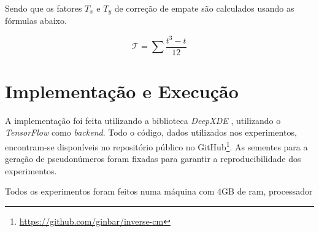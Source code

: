 Sendo que os fatores $T_x$ e $T_y$ de correção de empate são calculados
usando as fórmulas abaixo.  

\begin{equation}
\mathcal{T} = \sum \frac{t^3 - t}{12}
\end{equation}


\section{Implementação e Execução}

A implementação foi feita utilizando a biblioteca \textit{DeepXDE} \cite{lu-etal:21-deepxde}, 
utilizando o \textit{TensorFlow} \cite{tensorflow:16} como \textit{backend}. 
Todo o código, dados utilizados nos experimentos,
encontram-se disponíveis no repositório público no 
GitHub\footnote{\url{https://github.com/ginbar/inverse-cm}}.
As sementes para a geração de pseudonúmeros foram fixadas para garantir
a reproducibilidade dos experimentos.

Todos os experimentos foram feitos numa máquina com 4GB de ram, processador